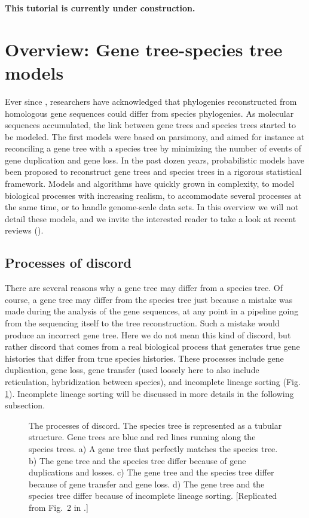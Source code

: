 \bigskip
\begin{center}
\textbf{\Large \color{red}This tutorial is currently under construction.}
\end{center}
\bigskip

\section{Overview: Gene tree-species tree models}

Ever since \cite{Zuckerkandl1965a}, researchers have acknowledged that phylogenies reconstructed from homologous gene sequences could differ from species phylogenies.
As molecular sequences accumulated, the link between gene trees and species trees started to be modeled. 
The first models were based on parsimony, and aimed for instance at reconciling a gene tree with a species tree by minimizing the number of events of gene duplication and gene loss. 
In the past dozen years, probabilistic models have been proposed to reconstruct gene trees and species trees in a rigorous statistical framework.
Models and algorithms have quickly grown in complexity, to model biological processes with increasing realism, to accommodate several processes at the same time, or to handle genome-scale data sets.
In this overview we will not detail these models, and we invite the interested reader to take a look at recent reviews (\EG \citep{Szollosi28072014}).

\subsection{Processes of discord}
There are several reasons why a gene tree may differ from a species tree. 
Of course, a gene tree may differ from the species tree just because a mistake was made during the analysis of the gene sequences, at any point in a pipeline going from the sequencing itself to the tree reconstruction.
Such a mistake would produce an incorrect gene tree.
Here we do not mean this kind of discord, but rather discord that comes from a real biological process that generates true gene histories that differ from true species histories.
These processes include gene duplication, gene loss, gene transfer (used loosely here to also include reticulation, hybridization between species), and incomplete lineage sorting (Fig. \ref{fig1}). 
Incomplete lineage sorting will be discussed in more details in the following subsection.

\begin{figure}[h!]
\centering
{}
\caption{\small The processes of discord. The species tree is represented as a tubular structure. Gene trees are blue and red lines running along the species trees. a) A gene tree that perfectly matches the species tree. b) The gene tree and the species tree differ because of gene duplications and losses. c)  The gene tree and the species tree differ because of gene transfer and gene loss. d)  The gene tree and the species tree differ because of incomplete lineage sorting.   [Replicated from Fig.~2 in \citet{Boussau2009}.]}
\label{fig1}
\end{figure}

